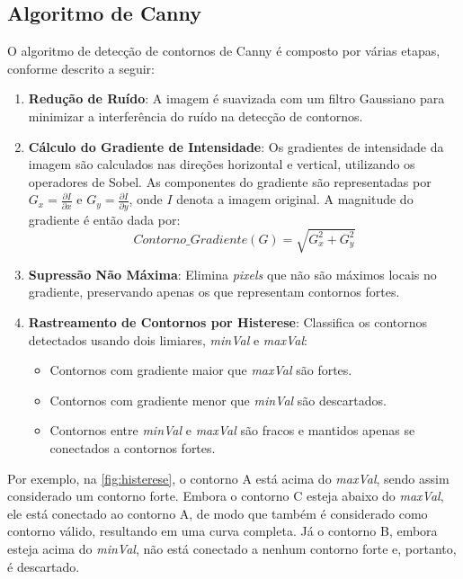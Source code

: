 \subsection{Algoritmo de Canny}

O algoritmo de detecção de contornos de Canny é composto por várias etapas, conforme descrito a seguir:
\begin{enumerate}
    \item \textbf{Redução de Ruído}: A imagem é suavizada com um filtro Gaussiano para minimizar a interferência do ruído na detecção de contornos.
    \item \textbf{Cálculo do Gradiente de Intensidade}: Os gradientes de intensidade da imagem são calculados nas direções horizontal e vertical, utilizando os operadores de Sobel. As componentes do gradiente são representadas por \( G_x = \frac{\partial I}{\partial x} \) e \( G_y = \frac{\partial I}{\partial y} \), onde \( I \) denota a imagem original. A magnitude do gradiente é então dada por:
    \[Contorno\_Gradiente(G) = \sqrt{G_{x}^{2} + G_{y}^{2}}\]
    \item \textbf{Supressão Não Máxima}: Elimina \textit{pixels} que não são máximos locais no gradiente, preservando apenas os que representam contornos fortes.
    \item \textbf{Rastreamento de Contornos por Histerese}: Classifica os contornos detectados usando dois limiares, \textit{minVal} e \textit{maxVal}:
    \begin{itemize}
        \item Contornos com gradiente maior que \textit{maxVal} são fortes.
        \item Contornos com gradiente menor que \textit{minVal} são descartados.
        \item Contornos entre \textit{minVal} e \textit{maxVal} são fracos e mantidos apenas se conectados a contornos fortes.
    \end{itemize}
\end{enumerate}

Por exemplo, na \autoref{fig:histerese}, o contorno A está acima do \textit{maxVal}, sendo assim considerado um contorno forte. Embora o contorno C esteja abaixo do \textit{maxVal}, ele está conectado ao contorno A, de modo que também é considerado como contorno válido, resultando em uma curva completa. Já o contorno B, embora esteja acima do \textit{minVal}, não está conectado a nenhum contorno forte e, portanto, é descartado.


